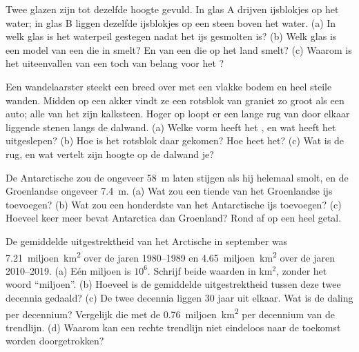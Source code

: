 \begin{exercise}[$\star\star$]\label{exo:g8:ice-on-earth:8}
Twee glazen zijn tot dezelfde hoogte gevuld. In glas A drijven ijsblokjes
op het water; in glas B liggen dezelfde ijsblokjes op een steen boven het
water. (a) In welk glas is het waterpeil gestegen nadat het ijs gesmolten
is? (b) Welk glas is een model van een  die in  smelt? En van een
 die op het land smelt? (c) Waarom is het uiteenvallen van een
 toch van belang voor het ?
\end{exercise}

\begin{exercise}[$\star\star$]\label{exo:g8:ice-on-earth:9}
Een wandelaarster steekt een breed  over met een vlakke bodem en heel
steile wanden. Midden op een akker vindt ze een rotsblok van graniet zo
groot als een auto; alle  van het  zijn kalksteen. Hoger op
loopt er een lange rug van door elkaar liggende stenen langs de dalwand.
(a) Welke vorm heeft het , en wat heeft het uitgeslepen? (b) Hoe is het
rotsblok daar gekomen? Hoe heet het? (c) Wat is de rug, en wat vertelt
zijn hoogte op de dalwand je?
\end{exercise}

\begin{exercise}[$\star\star$]\label{exo:g8:ice-on-earth:10}
De Antarctische  zou de  ongeveer \qty{58}{m} laten stijgen als
hij helemaal smolt, en de Groenlandse  ongeveer \qty{7.4}{m}.
(a) Wat zou een tiende van het Groenlandse ijs toevoegen? (b) Wat zou een
honderdste van het Antarctische ijs toevoegen? (c) Hoeveel keer meer
bevat Antarctica dan Groenland? Rond af op een heel getal.
\end{exercise}

\begin{exercise}[$\star\star\star$]\label{exo:g8:ice-on-earth:11}
De gemiddelde uitgestrektheid van het Arctische  in september was
\num{7.21}~miljoen~\unit{km^2} over de jaren 1980--1989 en
\num{4.65}~miljoen~\unit{km^2} over de jaren 2010--2019. (a) Eén miljoen
is $10^6$. Schrijf beide waarden in km$^2$, zonder het woord ``miljoen''.
(b) Hoeveel is de gemiddelde uitgestrektheid tussen deze twee decennia
gedaald? (c) De twee decennia liggen 30 jaar uit elkaar. Wat is de daling
per decennium? Vergelijk die met de \num{0.76}~miljoen~\unit{km^2} per
decennium van de trendlijn. (d) Waarom kan een rechte trendlijn niet
eindeloos naar de toekomst worden doorgetrokken?
\end{exercise}

